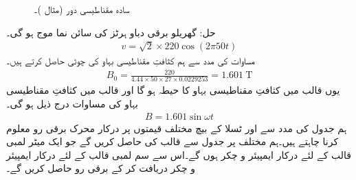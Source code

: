 \begin{figure}
\centering
{}%
\caption{سادہ مقناطیسی دور (مثال )۔}
\label{شکل_مقناطیسی__سادہ_مقناطیسی_دور_بغیر_درز_دوبارہ}
\end{figure}
حل:\quad
گھریلو برقی دباو  ہرٹز کی سائن نما موج ہو گی۔
\begin{align}
v=\sqrt{2} \times 220 \cos (2 \pi  50 t)
\end{align}
مساوات   کی مدد سے ہم کثافتِ مقناطیسی بہاو کی چوٹی حاصل کرتے ہیں۔
\begin{align}
B_0=\frac{220}{4.44 \times 50 \times 27 \times 0.0229253}=\SI{1.601}{\tesla}
\end{align}
یوں قالب میں کثافتِ مقناطیسی بہاو کا حیطہ    ہو گا اور   قالب میں کثافتِ مقناطیسی بہاو کی مساوات درج ذیل ہو گی۔
\begin{align}\label{مساوات_مقناطیسی_دور_سائن_نما_کثافت_بہاو}
B=1.601 \sin \omega t
\end{align}
ہم جدول کی مدد سے    اور  ٹسلا کے بیچ  مختلف قیمتوں پر درکار محرک برقی رو  معلوم کرنا چاہتے ہیں۔ہم مختلف  پر جدول  سے قالب کی  حاصل کریں گے جو  ایک میٹر لمبی قالب کے لئے درکار ایمپیئر و چکر ہوں گے۔اس سے  سم لمبی قالب کے لئے درکار ایمپیئر و چکر  دریافت کر کے برقی رو حاصل کریں گے۔

